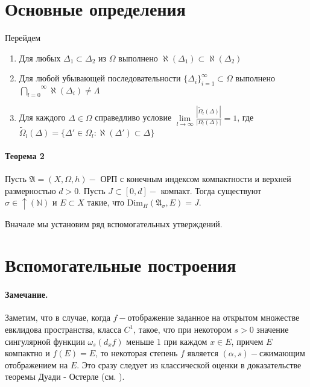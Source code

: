 \documentclass[10pt]{article}
\begin{document}
\section{Основные определения}

 Перейдем 
 
\begin{enumerate}
    \item Для любых $\Delta_1 \subset \Delta_2$
    из $\Omega$ выполнено
    $\aleph (\Delta_1) \subset \aleph(\Delta_2) $
    
    \item Для любой убывающей последовательности
    $\{\Delta_i\}_{i=1}^\infty \subset \Omega$
    выполнено
    $\overset{\infty}{\underset{l = 0}{\bigcap}}
    \aleph (\Delta_i) \neq \Lambda$ 
    
    \item Для каждого 
    $\Delta \in \Omega$
    справедливо условие
    $
    \underset{l \to \infty}{\lim}
    \frac{ | \tilde{\Omega}_l(\Delta) | }
         { | \Omega_l(\Delta) | } =
    1
    $,
    где
    $
    \tilde{\Omega}_l(\Delta) =
    \{\Delta' \in  \Omega_l : 
    \aleph (\Delta') \subset \Delta \}
    $
\end{enumerate}



\paragraph*{Теорема 2}

Пусть
$\mathfrak{A} = (X, \Omega, h) - $ ОРП
с конечным индексом компактности и верхней размерностью
$d > 0$.
Пусть $J \subset [0, d] - $ компакт.
Тогда существуют 
$\sigma  \in \uparrow (\mathbb{N}) $
и $E \subset X$ такие,
что $\mbox{Dim}_H (\mathfrak{A_\sigma}, E) = J$.


Вначале мы установим ряд 
вспомогательных утверждений.

\section{Вспомогательные построения}



\paragraph*{Замечание.}
Заметим, что в случае, когда
$f - $отображение заданное на открытом множестве
евклидова пространства, класса $C^1$,
такое, что
при некотором $s > 0$
значение сингулярной функции 
$\omega_s (d_x f) $
меньше $1$ при каждом 
$x \in E$,
причем $E$ компактно и
$f(E) = E$,
то некоторая степень $f$
является
$(\alpha, s) - $сжимающим отображением на $E$.
Это сразу следует из классической оценки в доказательстве теоремы Дуади - Остерле (см. \cite{scan_boch} ).




\end{document}
